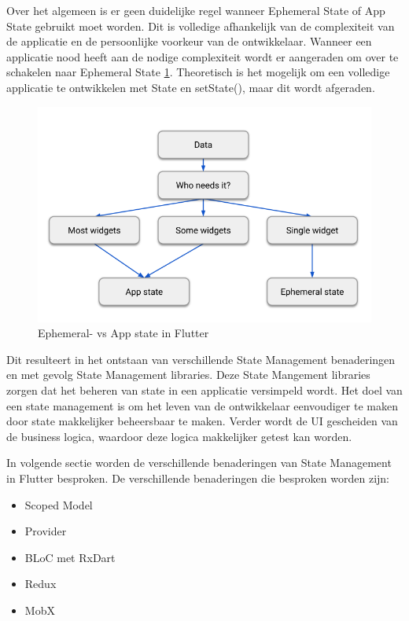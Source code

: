 Over het algemeen is er geen duidelijke regel wanneer Ephemeral State of App State gebruikt moet worden. Dit is volledige afhankelijk van de complexiteit van de applicatie en de persoonlijke voorkeur van de ontwikkelaar.
Wanneer een applicatie nood heeft aan de nodige complexiteit wordt er aangeraden om over te schakelen naar Ephemeral State \ref{fig:ephemeral-vs-app-state-flutter}. Theoretisch is het mogelijk om een volledige applicatie te ontwikkelen met State en setState(), maar dit wordt afgeraden.
\begin{figure}[H]
    \includegraphics[width=\linewidth]{img/stand-van-zaken/ephemeral-vs-app-state-flutter.png}
    \caption{Ephemeral- vs App state in Flutter}
    \label{fig:ephemeral-vs-app-state-flutter}
\end{figure}

Dit resulteert in het ontstaan van verschillende State Management benaderingen en met gevolg State Management libraries. Deze State Mangement libraries zorgen dat het beheren van state in een applicatie versimpeld wordt.
Het doel van een state management is om het leven van de ontwikkelaar eenvoudiger te
maken door state makkelijker beheersbaar te maken. Verder wordt de UI gescheiden van
de business logica, waardoor deze logica makkelijker getest kan worden.

In volgende sectie worden de verschillende benaderingen van State Management in Flutter besproken.
De verschillende benaderingen die besproken worden zijn: 
\begin{itemize}
    \item Scoped Model
    \item Provider
    \item BLoC met RxDart
    \item Redux
    \item MobX
\end{itemize}

